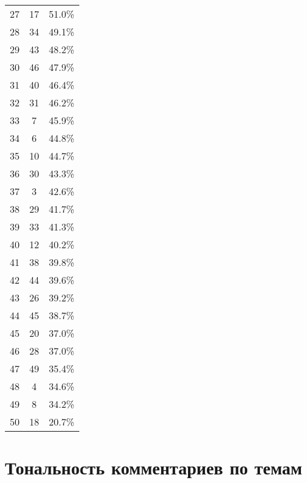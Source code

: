 \begin{longtable}[c]{|l|c|c|}
		27 & 17 & 51.0\% \\
		28 & 34 & 49.1\% \\
		29 & 43 & 48.2\% \\
		30 & 46 & 47.9\% \\
		31 & 40 & 46.4\% \\
		32 & 31 & 46.2\% \\
		33 & 7 & 45.9\% \\
		34 & 6 & 44.8\% \\
		35 & 10 & 44.7\% \\
		36 & 30 & 43.3\% \\
		37 & 3 & 42.6\% \\
		38 & 29 & 41.7\% \\
		39 & 33 & 41.3\% \\
		40 & 12 & 40.2\% \\
		41 & 38 & 39.8\% \\
		42 & 44 & 39.6\% \\
		43 & 26 & 39.2\% \\
		44 & 45 & 38.7\% \\
		45 & 20 & 37.0\% \\
		46 & 28 & 37.0\% \\
		47 & 49 & 35.4\% \\
		48 & 4 & 34.6\% \\
		49 & 8 & 34.2\% \\
		50 & 18 & 20.7\% \\
	\hline
\end{longtable}
\section{Тональность комментариев по темам}